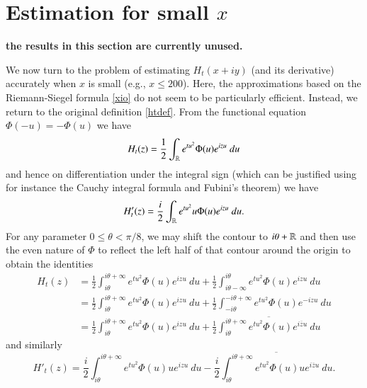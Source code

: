 \section{Estimation for small $x$}

{\bf the results in this section are currently unused.}

We now turn to the problem of estimating $H_t(x+iy)$ (and its derivative) accurately when $x$ is small (e.g., $x \leq 200$).  Here, the approximations based on the Riemann-Siegel formula \eqref{xio} do not seem to be particularly efficient.  Instead, we return to the original definition \eqref{htdef}.  From the functional equation $\Phi(-u)=-\Phi(u)$ we have
$$H_t(z) = \frac{1}{2} \int_{\mathbb{R}} e^{tu^2} \Phi(u) e^{izu}\ du$$
and hence on differentiation under the integral sign (which can be justified using for instance the Cauchy integral formula and Fubini's theorem) we have
$$H'_t(z) = \frac{i}{2} \int_{\mathbb{R}} e^{tu^2} u \Phi(u) e^{izu}\ du.$$
For any parameter $0 \leq \theta < \pi/8$, we may shift the contour to $i\theta + \mathbb{R}$ and then use the even nature of $\Phi$ to reflect the left half of that contour around the origin to obtain the identities
\begin{equation}\label{ident-1}
\begin{split}
H_t(z) &= \frac{1}{2} \int_{i\theta}^{i\theta+\infty} e^{tu^2} \Phi(u) e^{izu}\ du + \frac{1}{2} \int_{i\theta-\infty}^{i\theta} e^{tu^2} \Phi(u) e^{izu}\ du \\
&= \frac{1}{2} \int_{i\theta}^{i\theta+\infty} e^{tu^2} \Phi(u) e^{izu}\ du + \frac{1}{2} \int_{-i\theta}^{-i\theta+\infty} e^{tu^2} \Phi(u) e^{-izu}\ du\\
&= \frac{1}{2} \int_{i\theta}^{i\theta+\infty} e^{tu^2} \Phi(u) e^{izu}\ du + \frac{1}{2} \overline{\int_{i\theta}^{i\theta+\infty} e^{tu^2} \Phi(u) e^{i\overline{z}u}\ du}
\end{split}\end{equation}
and similarly
\begin{equation}\label{ident-2}
H'_t(z) = \frac{i}{2} \int_{i\theta}^{i\theta+\infty} e^{tu^2} \Phi(u) u e^{izu}\ du - \frac{i}{2} \overline{\int_{i\theta}^{i\theta+\infty} e^{tu^2} \Phi(u) u e^{i\overline{z}u}\ du}.
\end{equation}

